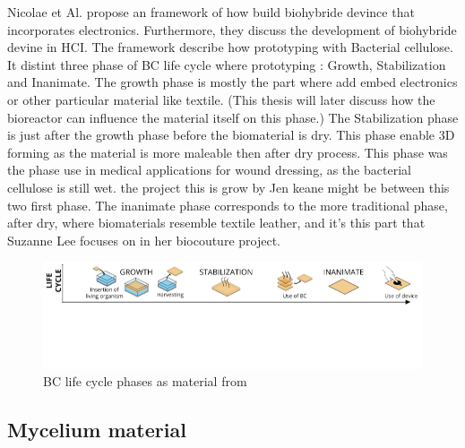 Nicolae et Al. propose an framework \cite{nicolae2023biohybrid} of how build biohybride devince that incorporates electronics. 
Furthermore, they discuss the development of biohybride devine in HCI. The framework describe how prototyping with Bacterial cellulose. It distint three phase of BC life cycle where prototyping : Growth, Stabilization and Inanimate. 
The growth phase is mostly the part where add embed electronics or other particular material like textile. (This thesis will later discuss how the bioreactor can influence the material itself on this phase.)
The Stabilization phase is just after the growth phase before the biomaterial is dry. This phase enable 3D forming as the material is more maleable then after dry process. This phase was the phase use in medical applications for wound dressing, as the bacterial cellulose is still wet. the project this is grow by Jen keane might be between this two first phase.
The inanimate phase corresponds to the more traditional phase, after dry, where biomaterials resemble textile leather, and it's this part that Suzanne Lee focuses on in her biocouture project. 

\begin{figure}[h]
    \centering
    \includegraphics[width=1.4\textwidth]{images/phase-proto.png}
    \caption{BC life cycle phases as material from\cite{nicolae2023biohybrid}}
    \label{fig:life cycle}
\end{figure}




\subsection{Mycelium material}

